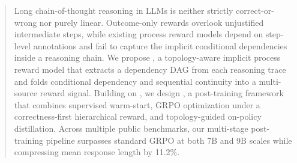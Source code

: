 \begin{abstract}
Long chain-of-thought reasoning in LLMs is neither strictly correct-or-wrong nor purely linear. Outcome-only rewards overlook unjustified intermediate steps, while existing process reward models depend on step-level annotations and fail to capture the implicit conditional dependencies inside a reasoning chain.
We propose \method, a topology-aware implicit process reward model that extracts a dependency DAG from each reasoning trace and folds conditional dependency and sequential continuity into a multi-source reward signal. Building on \method, we design \framework, a post-training framework that combines supervised warm-start, GRPO optimization under a correctness-first hierarchical reward, and topology-guided on-policy distillation.
Across multiple public benchmarks, our multi-stage post-training pipeline surpasses standard GRPO at both 7B and 9B scales while compressing mean response length by 11.2\%.
\end{abstract}